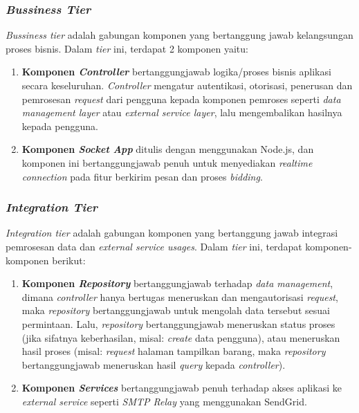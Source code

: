 	\subsubsection{\textit{Bussiness Tier}}
	\textit{Bussiness tier} adalah gabungan komponen yang bertanggung jawab kelangsungan proses bisnis. Dalam \textit{tier} ini, terdapat 2 komponen yaitu:
	\begin{enumerate}
		\item \textbf{Komponen \textit{Controller}} bertanggungjawab logika/proses bisnis aplikasi secara keseluruhan. \textit{Controller} mengatur autentikasi, otorisasi, penerusan dan pemrosesan \textit{request} dari pengguna kepada komponen pemroses seperti \textit{data management layer} atau \textit{external service layer}, lalu mengembalikan hasilnya kepada pengguna.
		\item \textbf{Komponen \textit{Socket App}}  ditulis dengan menggunakan Node.js, dan komponen ini bertanggungjawab penuh untuk menyediakan \textit{realtime connection} pada fitur berkirim pesan dan proses \textit{bidding}.
	\end{enumerate}
	
	\subsubsection{\textit{Integration Tier}}
	\textit{Integration tier} adalah gabungan komponen yang bertanggung jawab integrasi pemrosesan data dan \textit{external service usages}. Dalam \textit{tier} ini, terdapat komponen-komponen berikut:
	\begin{enumerate}
		\item \textbf{Komponen \textit{Repository}} bertanggungjawab terhadap \textit{data management}, dimana \textit{controller} hanya bertugas meneruskan dan mengautorisasi \textit{request}, maka \textit{repository} bertanggungjawab untuk mengolah data tersebut sesuai permintaan. Lalu, \textit{repository} bertanggungjawab meneruskan status proses (jika sifatnya keberhasilan, misal: \textit{create} data pengguna), atau meneruskan hasil proses (misal: \textit{request} halaman tampilkan barang, maka \textit{repository} bertanggungjawab meneruskan hasil \textit{query} kepada \textit{controller}). \\
		\item \textbf{Komponen \textit{Services}} bertanggungjawab penuh terhadap akses aplikasi ke \textit{external service} seperti \textit{SMTP Relay} yang menggunakan SendGrid.
	\end{enumerate}

